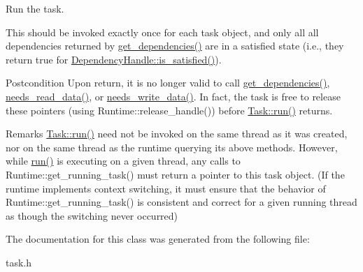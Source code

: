 Run the task. 

This should be invoked exactly once for each task object, and only all all dependencies returned by \hyperlink{classdarma__runtime_1_1abstract_1_1frontend_1_1_task_adbe380f89b64b6a60278ab5a62f96c06}{get\+\_\+dependencies()} are in a satisfied state (i.\+e., they return true for \hyperlink{classdarma__runtime_1_1abstract_1_1frontend_1_1_dependency_handle_acd5151a52a934a1a010975d692898c88}{Dependency\+Handle\+::is\+\_\+satisfied()}).

\begin{DoxyPostcond}{Postcondition}
Upon return, it is no longer valid to call \hyperlink{classdarma__runtime_1_1abstract_1_1frontend_1_1_task_adbe380f89b64b6a60278ab5a62f96c06}{get\+\_\+dependencies()}, \hyperlink{classdarma__runtime_1_1abstract_1_1frontend_1_1_task_a1cf2e35fe4770026d6039a06ca95c587}{needs\+\_\+read\+\_\+data()}, or \hyperlink{classdarma__runtime_1_1abstract_1_1frontend_1_1_task_a17a3f093c6cf7d8f591a83a044de7e41}{needs\+\_\+write\+\_\+data()}. In fact, the task is free to release these pointers (using Runtime\+::release\+\_\+handle()) before \hyperlink{classdarma__runtime_1_1abstract_1_1frontend_1_1_task_a0b17be7ac7b74aa1e1c54ce3f527cd14}{Task\+::run()} returns.
\end{DoxyPostcond}
\begin{DoxyRemark}{Remarks}
\hyperlink{classdarma__runtime_1_1abstract_1_1frontend_1_1_task_a0b17be7ac7b74aa1e1c54ce3f527cd14}{Task\+::run()} need not be invoked on the same thread as it was created, nor on the same thread as the runtime querying its above methods. However, while \hyperlink{classdarma__runtime_1_1abstract_1_1frontend_1_1_task_a0b17be7ac7b74aa1e1c54ce3f527cd14}{run()} is executing on a given thread, any calls to Runtime\+::get\+\_\+running\+\_\+task() must return a pointer to this task object. (If the runtime implements context switching, it must ensure that the behavior of Runtime\+::get\+\_\+running\+\_\+task() is consistent and correct for a given running thread as though the switching never occurred) 
\end{DoxyRemark}


The documentation for this class was generated from the following file\+:\begin{DoxyCompactItemize}
\item 
task.\+h\end{DoxyCompactItemize}
